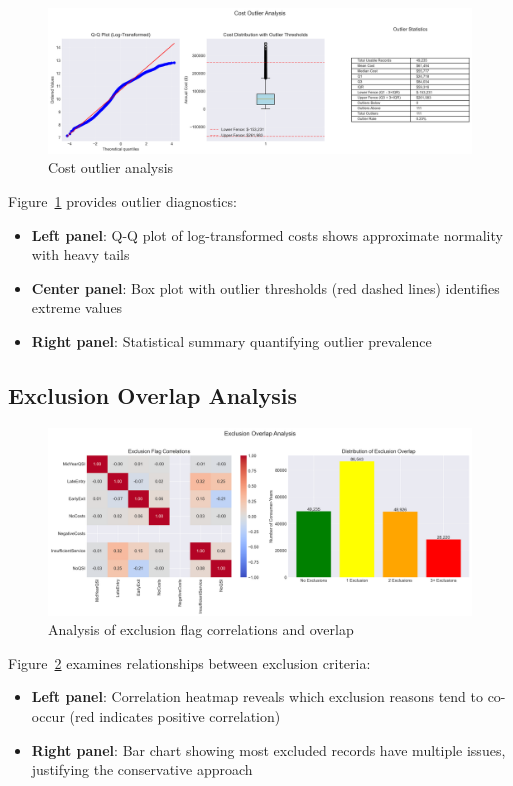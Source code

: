 \begin{figure}[h]
    \centering
    \includegraphics[width=\textwidth]{figures/cost_outliers.png}
    \caption{Cost outlier analysis}
    \label{fig:cost_outliers}
\end{figure}

Figure~\ref{fig:cost_outliers} provides outlier diagnostics:
\begin{itemize}
    \item \textbf{Left panel}: Q-Q plot of log-transformed costs shows approximate normality with heavy tails
    \item \textbf{Center panel}: Box plot with outlier thresholds (red dashed lines) identifies extreme values
    \item \textbf{Right panel}: Statistical summary quantifying outlier prevalence
\end{itemize}

\subsection{Exclusion Overlap Analysis}

\begin{figure}[h]
    \centering
    \includegraphics[width=\textwidth]{figures/exclusion_overlap.png}
    \caption{Analysis of exclusion flag correlations and overlap}
    \label{fig:exclusion_overlap}
\end{figure}

Figure~\ref{fig:exclusion_overlap} examines relationships between exclusion criteria:
\begin{itemize}
    \item \textbf{Left panel}: Correlation heatmap reveals which exclusion reasons tend to co-occur (red indicates positive correlation)
    \item \textbf{Right panel}: Bar chart showing most excluded records have multiple issues, justifying the conservative approach
\end{itemize}


